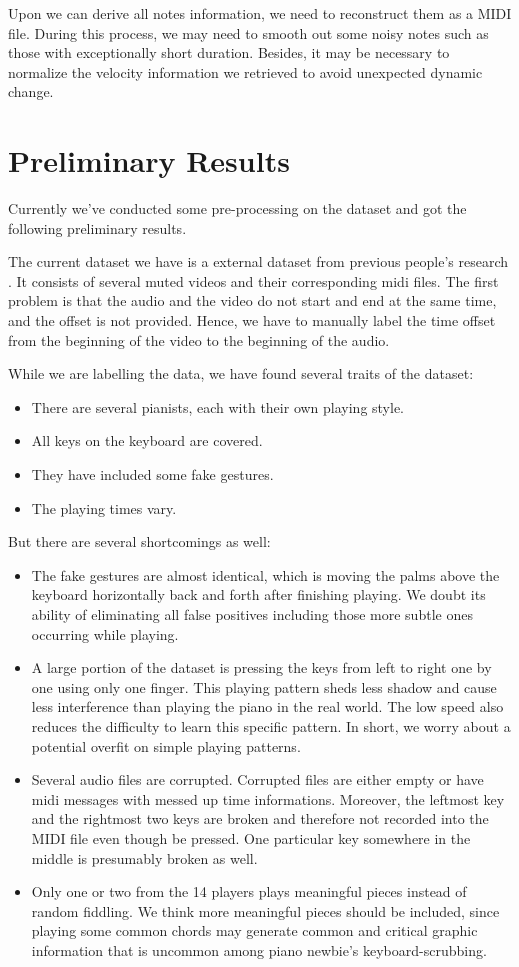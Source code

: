 \documentclass[10pt,twocolumn,letterpaper]{article}
\begin{document}
Upon we can derive all notes information, we need to reconstruct them as a MIDI file. During this process, we may need to smooth out some noisy notes such as those with exceptionally short duration. Besides, it may be necessary to normalize the velocity information we retrieved to avoid unexpected dynamic change.

\section{Preliminary Results}
Currently we've conducted some pre-processing on the dataset and got the following preliminary results.

The current dataset we have is a external dataset from previous people’s research \cite{Akbari}.
It consists of several muted videos and their corresponding midi files.
The first problem is that the audio and the video do not start and end at the same time, and the offset is not provided.
Hence, we have to manually label the time offset from the beginning of the video to the beginning of the audio.

While we are labelling the data, we have found several traits of the dataset:
\begin{itemize}
  \item There are several pianists, each with their own playing style.
  \item All keys on the keyboard are covered.
  \item They have included some fake gestures.
  \item The playing times vary.
\end{itemize}

But there are several shortcomings as well:
\begin{itemize}
  \item The fake gestures are almost identical, which is moving the palms above the keyboard horizontally back and forth after finishing playing. We doubt its ability of eliminating all false positives including those more subtle ones occurring while playing.
  \item A large portion of the dataset is pressing the keys from left to right one by one using only one finger. This playing pattern sheds less shadow and cause less interference than playing the piano in the real world. The low speed also reduces the difficulty to learn this specific pattern. In short, we worry about a potential overfit on simple playing patterns.
  \item Several audio files are corrupted. Corrupted files are either empty or have midi messages with messed up time informations. Moreover, the leftmost key and the rightmost two keys are broken and therefore not recorded into the MIDI file even though be pressed. One particular key somewhere in the middle is presumably broken as well.
  \item Only one or two from the 14 players plays meaningful pieces instead of random fiddling. We think more meaningful pieces should be included, since playing some common chords may generate common and critical graphic information that is uncommon among piano newbie’s keyboard-scrubbing.
\end{itemize}
\end{document}
